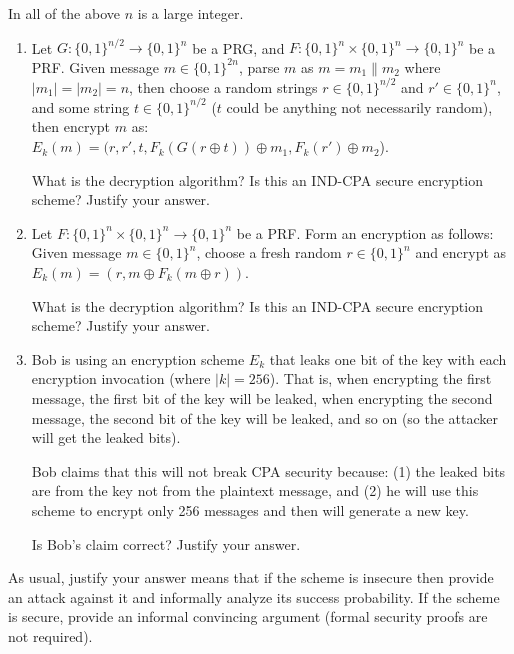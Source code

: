 \documentclass[12pt]{article}
\newcommand{\zo}{\{0,1\}}
\newcommand*\concat{\mathbin{\|}}
\newcommand\xor{\oplus}
\begin{document}
 In all of the above $n$ is a large integer.\newline
\newpage
{}
\begin{enumerate}
\item Let $G:\zo^{n/2} \to \zo^{n}$ be a PRG, and $F:\zo^n \times \zo^n \to \zo^n$ be a PRF. Given message $m \in \zo^{2n}$, parse $m$ as $m = m_1 \concat m_2$ where $|m_1| = |m_2| = n$, then choose a random strings $r \in \zo^{n/2}$ and $r' \in \zo^n$, and some string $t \in \zo^{n/2}$ ($t$ could be anything not necessarily random), then encrypt $m$ as:\\
$E_k(m) = (r, r', t, F_k(G(r \xor t)) \oplus m_1, F_k(r')\oplus m_2$). 

What is the decryption algorithm? Is this an IND-CPA secure encryption scheme? Justify your answer.   

\item Let $F: \zo^n \times \zo^n \rightarrow \zo^{n}$ be a PRF. Form an encryption as follows: Given message $m \in \zo^{n}$, choose a fresh random $r \in \zo^n$ and encrypt as $E_k(m) = (r, m \oplus F_k(m \xor r))$. 

What is the decryption algorithm? Is this an IND-CPA secure encryption scheme? Justify your answer.

\item Bob is using an encryption scheme $E_k$ that leaks one bit of the key with each encryption invocation (where $|k| = 256$). That is, when encrypting the first message, the first bit of the key will be leaked, when encrypting the second message, the second bit of the key will be leaked, and so on (so the attacker will get the leaked bits).

Bob claims that this will not break CPA security because: (1) the leaked bits are from the key not from the plaintext message, and (2) he will use this scheme to encrypt only 256 messages and then will generate a new key.

Is Bob's claim correct? Justify your answer.
\end{enumerate} 


 As usual, justify your answer means that if the scheme is insecure then provide an attack against it and informally analyze its success probability. If the scheme is secure, provide an informal convincing argument (formal security proofs are not required).\newline
\end{document}
